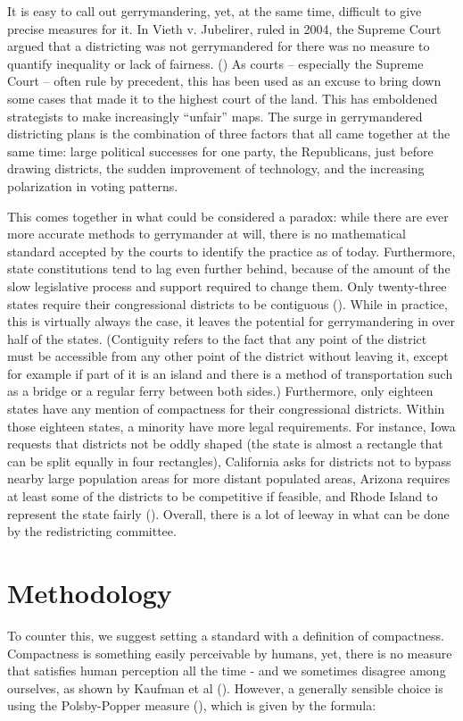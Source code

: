\documentclass[letterpaper]{article}
\begin{document}
It is easy to call out gerrymandering, yet, at the same time, difficult to give precise measures for it. In Vieth v. Jubelirer, ruled in 2004, the Supreme Court argued that a districting was not gerrymandered for there was no measure to quantify inequality or lack of fairness. (\cite{vieth}) As courts – especially the Supreme Court – often rule by precedent, this has been used as an excuse to bring down some cases that made it to the highest court of the land. This has emboldened strategists to make increasingly “unfair” maps. The surge in gerrymandered districting plans is the combination of three factors that all came together at the same time: large political successes for one party, the Republicans, just before drawing districts, the sudden improvement of technology, and the increasing polarization in voting patterns.


This comes together in what could be considered a paradox: while there are ever more accurate methods to gerrymander at will, there is no mathematical standard accepted by the courts to identify the practice as of today. Furthermore, state constitutions tend to lag even further behind, because of the amount of the slow legislative process and support required to change them. Only twenty-three states require their congressional districts to be contiguous (\cite{contiguity}). While in practice, this is virtually always the case, it leaves the potential for gerrymandering in over half of the states. (Contiguity refers to the fact that any point of the district must be accessible from any other point of the district without leaving it, except for example if part of it is an island and there is a method of transportation such as a bridge or a regular ferry between both sides.) Furthermore, only eighteen states have any mention of compactness for their congressional districts. Within those eighteen states, a minority have more legal requirements. For instance, Iowa requests that districts not be oddly shaped (the state is almost a rectangle that can be split equally in four rectangles), California asks for districts not to bypass nearby large population areas for more distant populated areas, Arizona requires at least some of the districts to be competitive if feasible, and Rhode Island to represent the state fairly (\cite{contiguity}). Overall, there is a lot of leeway in what can be done by the redistricting committee. 


\section{Methodology}
To counter this, we suggest setting a standard with a definition of compactness. Compactness is something easily perceivable by humans, yet, there is no measure that satisfies human perception all the time - and we sometimes disagree among ourselves, as shown by Kaufman et al (\cite{king}).
However, a generally sensible choice is using the Polsby-Popper measure (\cite{polsbypopper}), which is given by the formula:
\end{document}
